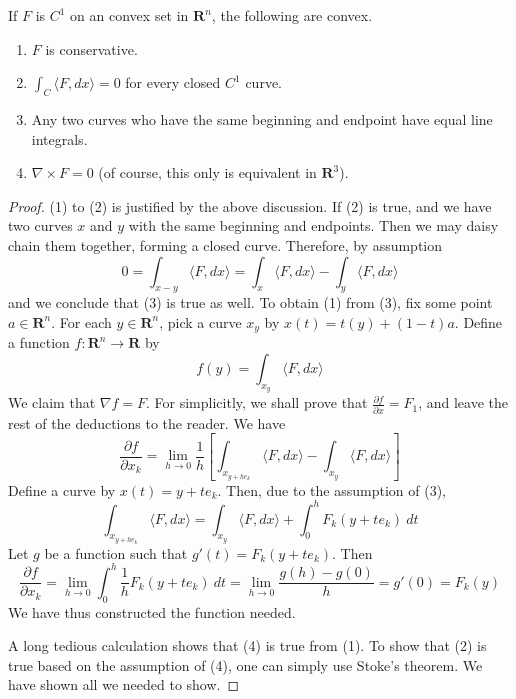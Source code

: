 \begin{theorem}
    If $F$ is $C^1$ on an convex set in $\mathbf{R}^n$, the following are convex.
    \begin{enumerate}
        \item $F$ is conservative.
        \item $\int_C \langle F, dx \rangle = 0$ for every closed $C^1$ curve.
        \item Any two curves who have the same beginning and endpoint have equal line integrals.
        \item $\nabla \times F = 0$ (of course, this only is equivalent in $\mathbf{R}^3$).
    \end{enumerate}
\end{theorem}
\begin{proof}
    (1) to (2) is justified by the above discussion. If (2) is true, and we have two curves $x$ and $y$ with the same beginning and endpoints. Then we may daisy chain them together, forming a closed curve. Therefore, by assumption
    \[ 0 = \int_{x - y} \langle F, dx \rangle = \int_x \langle F, dx \rangle - \int_y \langle F, dx \rangle  \]
    and we conclude that (3) is true as well. To obtain (1) from (3), fix some point $a \in \mathbf{R}^n$. For each $y \in \mathbf{R}^n$, pick a curve $x_y$ by $x(t) = t(y) + (1-t)a$. Define a function $f:\mathbf{R}^n \to \mathbf{R}$ by
    \[ f(y) = \int_{x_y} \langle F, dx \rangle \]
    We claim that $\nabla f = F$. For simplicitly, we shall prove that $\frac{\partial f}{\partial x} = F_1$, and leave the rest of the deductions to the reader. We have
    \[ \frac{\partial f}{\partial x_k} = \lim_{h \to 0} \frac{1}{h} \left[ \int_{x_{y+he_k}} \langle F, dx \rangle - \int_{x_y} \langle F, dx \rangle \right] \]
    Define a curve by $x(t) = y + te_k$. Then, due to the assumption of (3),
    \[ \int_{x_{y + he_k}} \langle F, dx \rangle = \int_{x_y} \langle F, dx \rangle + \int_0^h F_k(y + te_k)\ dt \]
    Let $g$ be a function such that $g'(t) = F_k(y + te_k)$. Then
    \[ \frac{\partial f}{\partial x_k} = \lim_{h \to 0} \int_0^h \frac{1}{h} F_k(y + te_k)\ dt = \lim_{h \to 0} \frac{g(h) - g(0)}{h} = g'(0) = F_k(y) \]
    We have thus constructed the function needed.

    A long tedious calculation shows that (4) is true from (1). To show that (2) is true based on the assumption of (4), one can simply use Stoke's theorem. We have shown all we needed to show.
\end{proof}

